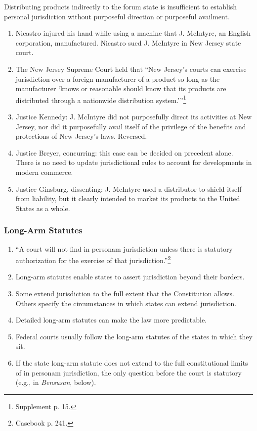 Distributing products indirectly to the forum state is insufficient to 
establish personal jurisdiction without purposeful direction or purposeful 
availment.

\begin{enumerate}
    \item Nicastro injured his hand while using a machine that J. McIntyre, an 
    English corporation, manufactured. Nicastro sued J. McIntyre in New Jersey 
    state court.  \item The New Jersey Supreme Court held that \enquote{New 
    Jersey's courts can exercise jurisdiction over a foreign manufacturer of a 
    product so long as the manufacturer \enquote{knows or reasonable should 
    know that its products are distributed through a nationwide distribution 
    system.}}\footnote{Supplement p. 15.}
    \item Justice Kennedy: J. McIntyre did not purposefully direct its 
    activities at New Jersey, nor did it purposefully avail itself of the 
    privilege of the benefits and protections of New Jersey's laws. Reversed.
    \item Justice Breyer, concurring: this case can be decided on precedent 
    alone. There is no need to update jurisdictional rules to account for 
    developments in modern commerce.
    \item Justice Ginsburg, dissenting: J. McIntyre used a distributor to 
    shield itself from liability, but it clearly intended to market its 
    products to the United States as a whole.
\end{enumerate}

\subsubsection{Long-Arm Statutes}

\begin{enumerate}
    \item ``A court will not find in personam jurisdiction unless there is 
    statutory authorization for the exercise of that 
    jurisdiction.''\footnote{Casebook p. 241.}
    \item Long-arm statutes enable states to assert jurisdiction beyond their 
    borders.
    \item Some extend jurisdiction to the full extent that the Constitution 
    allows. Others specify the circumstances in which states can extend 
    jurisdiction.
    \item Detailed long-arm statutes can make the law more predictable.
    \item Federal courts usually follow the long-arm statutes of the states in 
    which they sit.
    \item If the state long-arm statute does not extend to the full 
    constitutional limits of in personam jurisdiction, the only question 
    before the court is statutory (e.g., in \emph{Bensusan}, below).
\end{enumerate}

